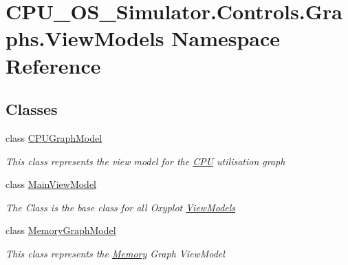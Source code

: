 \hypertarget{namespace_c_p_u___o_s___simulator_1_1_controls_1_1_graphs_1_1_view_models}{}\section{C\+P\+U\+\_\+\+O\+S\+\_\+\+Simulator.\+Controls.\+Graphs.\+View\+Models Namespace Reference}
\label{namespace_c_p_u___o_s___simulator_1_1_controls_1_1_graphs_1_1_view_models}
\subsection*{Classes}
\begin{DoxyCompactItemize}
\item 
class \hyperlink{class_c_p_u___o_s___simulator_1_1_controls_1_1_graphs_1_1_view_models_1_1_c_p_u_graph_model}{C\+P\+U\+Graph\+Model}
\begin{DoxyCompactList}\small\item\em This class represents the view model for the \hyperlink{namespace_c_p_u___o_s___simulator_1_1_c_p_u}{C\+P\+U} utilisation graph \end{DoxyCompactList}\item 
class \hyperlink{class_c_p_u___o_s___simulator_1_1_controls_1_1_graphs_1_1_view_models_1_1_main_view_model}{Main\+View\+Model}
\begin{DoxyCompactList}\small\item\em The Class is the base class for all Oxyplot \hyperlink{namespace_c_p_u___o_s___simulator_1_1_controls_1_1_graphs_1_1_view_models}{View\+Models} \end{DoxyCompactList}\item 
class \hyperlink{class_c_p_u___o_s___simulator_1_1_controls_1_1_graphs_1_1_view_models_1_1_memory_graph_model}{Memory\+Graph\+Model}
\begin{DoxyCompactList}\small\item\em This class represents the \hyperlink{namespace_c_p_u___o_s___simulator_1_1_memory}{Memory} Graph View\+Model \end{DoxyCompactList}\end{DoxyCompactItemize}
